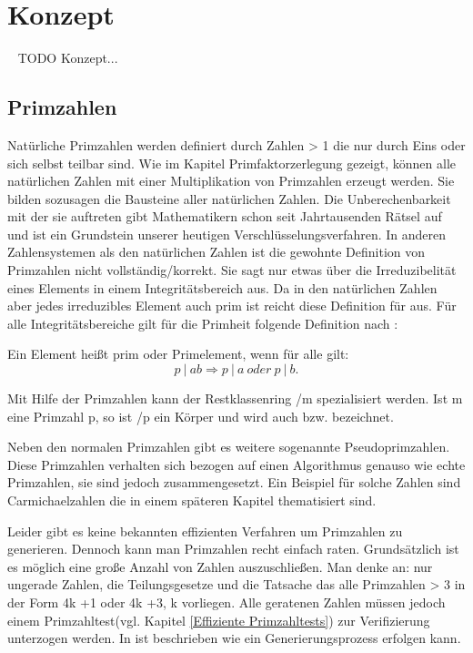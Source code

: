 \section*{Konzept}~\label{Kapitel Konzept}
	TODO Konzept...
	
	\subsection*{Primzahlen}\label{Kapitel Primzahlen}
		Natürliche Primzahlen werden definiert durch Zahlen > 1 die nur durch Eins oder sich selbst teilbar sind. Wie im Kapitel Primfaktorzerlegung gezeigt, können alle natürlichen Zahlen mit einer Multiplikation von Primzahlen erzeugt werden. Sie bilden sozusagen die Bausteine aller natürlichen Zahlen. Die Unberechenbarkeit mit der sie auftreten gibt Mathematikern schon seit Jahrtausenden Rätsel auf und ist ein Grundstein unserer heutigen Verschlüsselungsverfahren.
		In anderen Zahlensystemen als den natürlichen Zahlen ist die gewohnte Definition von Primzahlen nicht vollständig/korrekt. Sie sagt nur etwas über die Irreduzibelität eines Elements in einem Integritätsbereich aus. Da in den natürlichen Zahlen aber jedes irreduzibles Element auch prim ist reicht diese Definition für  aus.
		Für alle Integritätsbereiche gilt für die Primheit folgende Definition nach \cite{Algorithmische:Zahlentheorie}:
	
		Ein Element  heißt prim oder Primelement, wenn für alle  gilt:	
		\begin{displaymath}
			p~|~ab \Longrightarrow p~|~a~oder~p~|~b.
		\end{displaymath}
		
		Mit Hilfe der Primzahlen kann der Restklassenring /m spezialisiert werden. Ist m eine Primzahl p, so ist /p ein Körper und wird auch  bzw.  bezeichnet.
		
		Neben den normalen Primzahlen gibt es weitere sogenannte Pseudoprimzahlen. Diese Primzahlen verhalten sich bezogen auf einen Algorithmus genauso wie echte Primzahlen, sie sind jedoch zusammengesetzt. Ein Beispiel für solche Zahlen sind Carmichaelzahlen die in einem späteren Kapitel thematisiert sind.
		
		Leider gibt es keine bekannten effizienten Verfahren um Primzahlen zu generieren. Dennoch kann man Primzahlen recht einfach raten. Grundsätzlich ist es möglich eine große Anzahl von Zahlen auszuschließen. Man denke an: nur ungerade Zahlen, die Teilungsgesetze und die Tatsache das alle Primzahlen > 3 in der Form 4k +1 oder 4k +3, k \myin {} vorliegen. Alle geratenen Zahlen müssen jedoch einem Primzahltest(vgl. Kapitel \ref{Effiziente Primzahltests}) zur Verifizierung unterzogen werden. In \cite{Algebraische:und:zahlentheoretische:Grundlagen:fuer:die:Informatik} ist beschrieben wie ein Generierungsprozess erfolgen kann.
	
